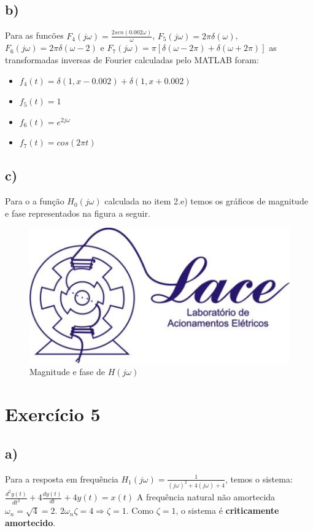 \documentclass{article}[a4paper,12pt,twoside]
\begin{document}
\subsection{b)}
Para as funcões $F_4(j\omega)=\frac{2sen(0.002\omega)}{\omega}$, $F_5(j\omega)=2 \pi \delta(\omega)$, $F_6(j\omega)=2 \pi \delta(\omega-2)$ e $F_7(j\omega)=\pi[\delta(\omega-2 \pi)+\delta(\omega+2 \pi)]$ as transformadas inversas de Fourier calculadas pelo MATLAB foram:
\begin{itemize}
    \item $f_4(t)= \delta(1,x-0.002) + \delta(1,x+0.002)$
    \item $f_5(t)=1$
    \item $f_6(t)=e^{2j\omega}$
    \item $f_7(t)=cos(2 \pi t)$
\end{itemize}

\subsection{c)}

Para o a função $H_0(j \omega)$ calculada no item 2.e) temos os gráficos de magnitude e fase representados na figura a seguir.
\begin{figure}[H]
    \centering
    \includegraphics[width = 0.85 \textwidth]{a}
    \caption{Magnitude e fase de $H(j \omega)$}
    \label{fig:my_label}
\end{figure}

\section{Exercício 5}
\subsection{a)} 
Para a resposta em frequência $H_1(j\omega)=\frac{1}{(j\omega)^2+4(j\omega)+4}$, temos o sistema:\\ $\frac{d^2y(t)}{dt^2}+4\frac{dy(t)}{dt}+4y(t)=x(t)$
\newline \newline
A frequência natural não amortecida $\omega_n = \sqrt{4} = 2$.
\newline
$2\omega_n\zeta=4 \Longrightarrow \zeta = 1$. Como $\zeta=1$, o sistema é \textbf{criticamente amortecido}.\newline \newline
\end{document}
